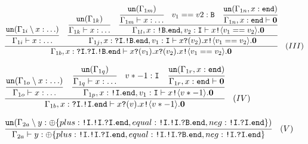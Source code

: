 \documentclass{l4proj}
\begin{document}
\begin{figure}[H]
\begin{subfigure}{\textwidth}
\[\cfrac{\cfrac{\texttt{un}(\Gamma_{1i} \setminus x : \ldots)}{\Gamma_{1i} \vdash x : \ldots} \quad \cfrac{\cfrac{\texttt{un}(\Gamma_{1k})}{\Gamma_{1k}  \vdash x : \ldots} \quad \cfrac{\cfrac{\texttt{un}(\Gamma_{1m})}{\Gamma_{1m} \vdash x : \ldots} \quad v_{1} == v{2} : \texttt{B} \quad \cfrac{\texttt{un}(\Gamma_{1n}, x : \texttt{end})}{\Gamma_{1n}, x : \texttt{end} \vdash \textbf{0}} }{\Gamma_{1l}, x : \texttt{!B}.\texttt{end}, v_{2} : \texttt{I} \vdash x\texttt{!} \langle v_{1} == v_{2} \rangle .\textbf{0}}}{\Gamma_{1j}, x : \texttt{?I}.\texttt{!B}.\texttt{end}, v_{1} : \texttt{I} \vdash x\texttt{?}(v_{2}).x\texttt{!} \langle v_{1} == v_{2} \rangle .\textbf{0}}}{\Gamma_{1b}, x : \texttt{?I}.\texttt{?I}.\texttt{!B}.\texttt{end} \vdash x\texttt{?}(v_{1}).x\texttt{?}(v_{2}).x\texttt{!} \langle v_{1} == v_{2} \rangle .\textbf{0}} \quad \displaystyle{(III)}\]
\vspace{\fill}
\end{subfigure}

\begin{subfigure}{\textwidth}
\[\cfrac{\cfrac{\texttt{un}(\Gamma_{1o} \setminus x : \ldots)}{\Gamma_{1o} \vdash x : \ldots} \quad \cfrac{\cfrac{\texttt{un}(\Gamma_{1q})}{\Gamma_{1q}  \vdash x : \ldots} \quad v * -1 : \texttt{I} \quad \cfrac{\texttt{un}(\Gamma_{1r}, x : \texttt{end})}{\Gamma_{1r}, x : \texttt{end} \vdash \textbf{0}}}{\Gamma_{1p}, x : \texttt{!I}.\texttt{end}, v_{1} : \texttt{I} \vdash x\texttt{!} \langle v * -1 \rangle .\textbf{0}}}{\Gamma_{1b}, x : \texttt{?I}.\texttt{!I}.\texttt{end} \vdash x\texttt{?}(v).x\texttt{!} \langle v * -1 \rangle .\textbf{0}} \quad \displaystyle{(IV)}\]
\vspace{\fill}
\end{subfigure}

\begin{subfigure}{\textwidth}
\[\cfrac{\texttt{un}(\Gamma_{2a} \setminus y : \oplus\{plus : \texttt{!I}.\texttt{!I}.\texttt{?I}.\texttt{end}, equal : \texttt{!I}.\texttt{!I}.\texttt{?B}.\texttt{end}, neg : \texttt{!I}.\texttt{?I}.\texttt{end}\})}{\Gamma_{2a} \vdash y : \oplus\{plus : \texttt{!I}.\texttt{!I}.\texttt{?I}.\texttt{end}, equal : \texttt{!I}.\texttt{!I}.\texttt{?B}.\texttt{end}, neg : \texttt{!I}.\texttt{?I}.\texttt{end}\}}  \quad \displaystyle{(V)}\]
\vspace{\fill}
\end{subfigure}


\end{figure}
\end{document}
